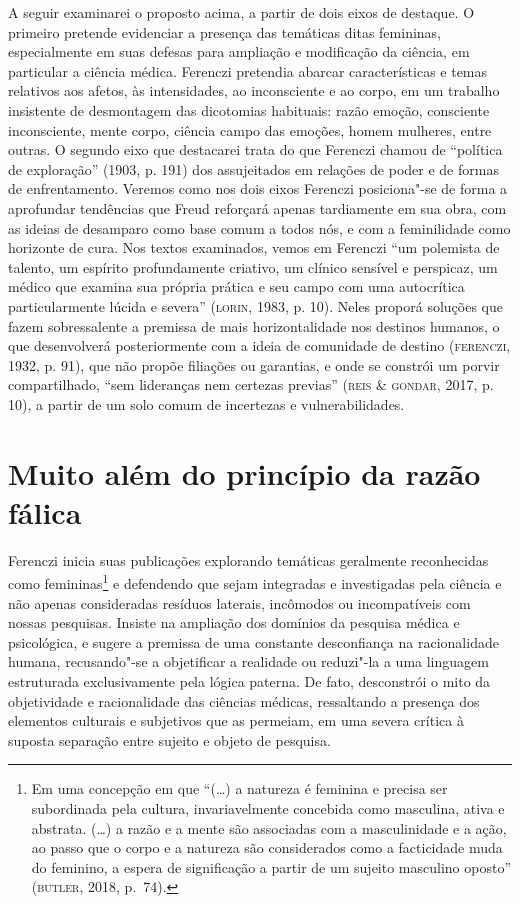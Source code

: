 A seguir examinarei o proposto acima, a partir de dois eixos de
destaque. O primeiro pretende evidenciar a presença das temáticas ditas
femininas, especialmente em suas defesas para ampliação e modificação da
ciência, em particular a ciência médica. Ferenczi pretendia abarcar
características e temas relativos aos afetos, às intensidades, ao
inconsciente e ao corpo, em um trabalho insistente de desmontagem das
dicotomias habituais: razão  emoção, consciente  inconsciente, mente  corpo, ciência  campo das emoções, homem  mulheres, entre outras. O
segundo eixo que destacarei trata do que Ferenczi chamou de ``política
de exploração'' (1903, p. 191) dos assujeitados em relações de
poder e de formas de enfrentamento. Veremos como nos dois eixos Ferenczi
posiciona"-se de forma a aprofundar tendências que Freud reforçará apenas
tardiamente em sua obra, com as ideias de desamparo como base comum a
todos nós, e com a feminilidade como horizonte de cura. Nos textos
examinados, vemos em Ferenczi ``um polemista de talento, um espírito
profundamente criativo, um clínico sensível e perspicaz, um médico que
examina sua própria prática e seu campo com uma autocrítica
particularmente lúcida e severa'' (\textsc{lorin}, 1983, p. 10). Neles proporá
soluções que fazem sobressalente a premissa de mais horizontalidade nos
destinos humanos, o que desenvolverá posteriormente com a ideia de
comunidade de destino (\textsc{ferenczi}, 1932, p. 91), que não propõe filiações
ou garantias, e onde se constrói um porvir compartilhado, ``sem
lideranças nem certezas previas'' (\textsc{reis} \& \textsc{gondar}, 2017, p. 10), a partir
de um solo comum de incertezas e vulnerabilidades.

\section{Muito além do princípio da razão fálica }

Ferenczi inicia suas publicações explorando temáticas geralmente
reconhecidas como femininas\footnote{Em uma concepção em que ``(\ldots{}) a
  natureza é feminina e precisa ser subordinada pela cultura,
  invariavelmente concebida como masculina, ativa e abstrata. (\ldots{}) a
  razão e a mente são associadas com a masculinidade e a ação, ao passo
  que o corpo e a natureza são considerados como a facticidade muda do
  feminino, a espera de significação a partir de um sujeito masculino
  oposto'' (\textsc{butler}, 2018, p.~74).} e defendendo que sejam integradas e
investigadas pela ciência e não apenas consideradas resíduos laterais,
incômodos ou incompatíveis com nossas pesquisas. Insiste na ampliação
dos domínios da pesquisa médica e psicológica, e sugere a premissa de
uma constante desconfiança na racionalidade humana, recusando"-se a
objetificar a realidade ou reduzi"-la a uma linguagem estruturada
exclusivamente pela lógica paterna. De fato, desconstrói o mito da
objetividade e racionalidade das ciências médicas, ressaltando a
presença dos elementos culturais e subjetivos que as permeiam, em uma
severa crítica à suposta separação entre sujeito e objeto de pesquisa.

